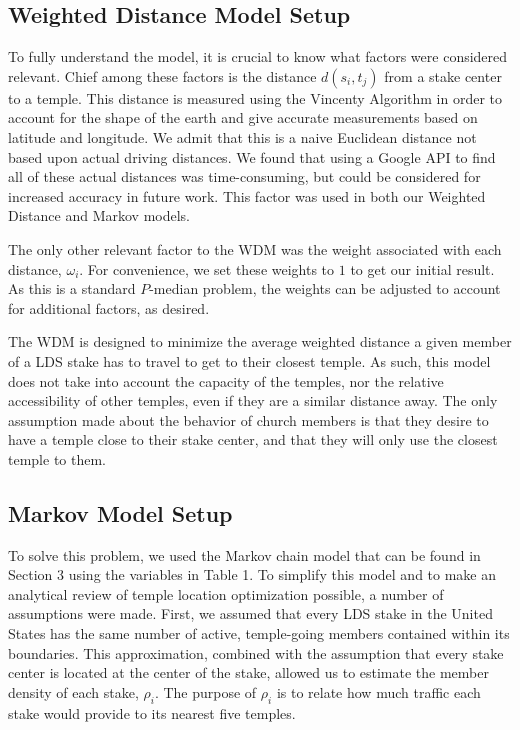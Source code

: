 \documentclass[twoside,twocolumn]{article}
\begin{document}
\subsection{Weighted Distance Model Setup}

To fully understand the model, it is crucial to know what factors were considered relevant.
Chief among these factors is the distance $d(s_i,t_j)$ from a stake center to a temple. %
This distance is measured using the Vincenty Algorithm in order to account for the shape of the earth and give accurate measurements based on latitude and longitude. %
We admit that this is a naive Euclidean distance not based upon actual driving distances.
We found that using a Google API to find all of these actual distances was time-consuming, but could be considered for increased accuracy in future work. %
This factor was used in both our Weighted Distance and Markov models.

The only other relevant factor to the WDM was the weight associated with each distance, $\omega_i$. %
For convenience, we set these weights to $1$ to get our initial result.
As this is a standard $P$-median problem, the weights can be adjusted to account for additional factors, as desired.

The WDM is designed to minimize the average weighted distance a given member of a LDS stake has to travel to get to their closest temple.
As such, this model does not take into account the capacity of the temples, nor the relative accessibility of other temples, even if they are a similar distance away.
The only assumption made about the behavior of church members is that they desire to have a temple close to their stake center, and that they will only use the closest temple to them. %

\subsection{Markov Model Setup}

To solve this problem, we used the Markov chain model that can be found in Section 3 using the variables in Table 1.
To simplify this model and to make an analytical review of temple location optimization possible, a number of assumptions were made.
First, we assumed that every LDS stake in the United States has the same number of active, temple-going members contained within its boundaries.
This approximation, combined with the assumption that every stake center is located at the center of the stake, allowed us to estimate the member density of each stake, $\rho_i$.
The purpose of $\rho_{i}$ is to relate how much traffic each stake would provide to its nearest five temples. %
\end{document}
